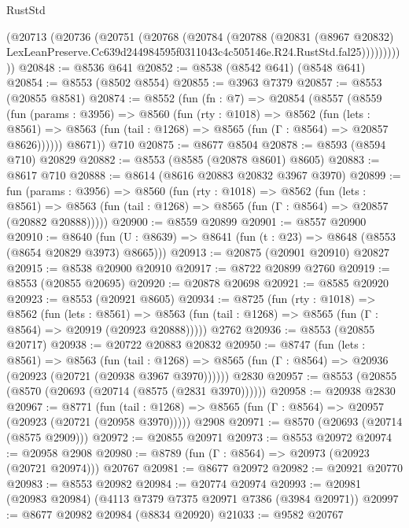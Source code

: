 \begin{lexlean}{RustStd}
\begin{coremodule}
            (@20713
              (@20736
                (@20751
                  (@20768
                    (@20784
                      (@20788
                        (@20831
                          (@8967 @20832)
                          LexLeanPreserve.Cc639d244984595f0311043c4c505146e.R24.RustStd.fal25)))))))))))
@20848 := @8536 @641
@20852 := @8538 (@8542 @641) (@8548 @641)
@20854 := @8553 (@8502 @8554)
@20855 := @3963 @7379
@20857 := @8553 (@20855 @8581)
@20874 := @8552
    (fun (fn : @7) =>
    @20854
      (@8557
        (@8559
          (fun (params : @3956) =>
          @8560
            (fun (rty : @1018) =>
            @8562
              (fun (lets : @8561) =>
              @8563 (fun (tail : @1268) => @8565 (fun (Γ : @8564) => @20857 @8626))))))
        @8671))
    @710
@20875 := @8677 @8504
@20878 := @8593 (@8594 @710) @20829
@20882 := @8553 (@8585 (@20878 @8601) @8605)
@20883 := @8617 @710
@20888 := @8614 (@8616 @20883 @20832 @3967 @3970)
@20899 := fun (params : @3956) =>
  @8560
    (fun (rty : @1018) =>
    @8562
      (fun (lets : @8561) =>
      @8563 (fun (tail : @1268) => @8565 (fun (Γ : @8564) => @20857 (@20882 @20888)))))
@20900 := @8559 @20899
@20901 := @8557 @20900
@20910 := @8640
    (fun (U : @8639) => @8641 (fun (t : @23) => @8648 (@8553 (@8654 @20829 @3973) @8665)))
@20913 := @20875 (@20901 @20910) @20827
@20915 := @8538 @20900 @20910
@20917 := @8722 @20899 @2760
@20919 := @8553 (@20855 @20695)
@20920 := @20878 @20698
@20921 := @8585 @20920
@20923 := @8553 (@20921 @8605)
@20934 := @8725
    (fun (rty : @1018) =>
    @8562
      (fun (lets : @8561) =>
      @8563 (fun (tail : @1268) => @8565 (fun (Γ : @8564) => @20919 (@20923 @20888)))))
    @2762
@20936 := @8553 (@20855 @20717)
@20938 := @20722 @20883 @20832
@20950 := @8747
    (fun (lets : @8561) =>
    @8563
      (fun (tail : @1268) =>
      @8565 (fun (Γ : @8564) => @20936 (@20923 (@20721 (@20938 @3967 @3970))))))
    @2830
@20957 := @8553 (@20855 (@8570 (@20693 (@20714 (@8575 (@2831 @3970))))))
@20958 := @20938 @2830
@20967 := @8771
    (fun (tail : @1268) => @8565 (fun (Γ : @8564) => @20957 (@20923 (@20721 (@20958 @3970)))))
    @2908
@20971 := @8570 (@20693 (@20714 (@8575 @2909)))
@20972 := @20855 @20971
@20973 := @8553 @20972
@20974 := @20958 @2908
@20980 := @8789 (fun (Γ : @8564) => @20973 (@20923 (@20721 @20974))) @20767
@20981 := @8677 @20972
@20982 := @20921 @20770
@20983 := @8553 @20982
@20984 := @20774 @20974
@20993 := @20981 (@20983 @20984) (@4113 @7379 @7375 @20971 @7386 (@3984 @20971))
@20997 := @8677 @20982 @20984 (@8834 @20920)
@21033 := @9582
    @20767

\end{coremodule}
\end{lexlean}
